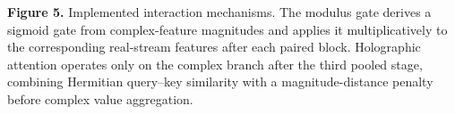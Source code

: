 \documentclass{article}
\begin{document}
\vspace{0.05in}
\begin{minipage}{7.00in}
\scriptsize
\textbf{Figure 5.} Implemented interaction mechanisms. The modulus gate derives a sigmoid gate from complex-feature magnitudes and applies it multiplicatively to the corresponding real-stream features after each paired block. Holographic attention operates only on the complex branch after the third pooled stage, combining Hermitian query--key similarity with a magnitude-distance penalty before complex value aggregation.
\end{minipage}
\end{document}
